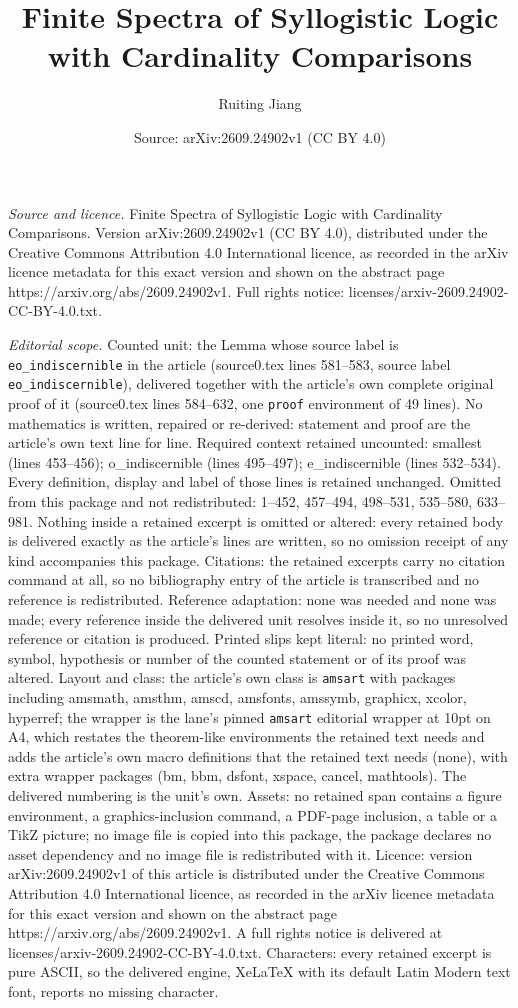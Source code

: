 \documentclass[10pt,a4paper]{amsart}
\title[Finite Spectra of Syllogistic Logic with Cardinality Compari]{Finite Spectra of Syllogistic Logic with Cardinality Comparisons}
\author{Ruiting Jiang}
\date{Source: arXiv:2609.24902v1 (CC BY 4.0)}
\begin{document}
\maketitle

\noindent\emph{Source and licence.} Finite Spectra of Syllogistic Logic with Cardinality Comparisons. Version arXiv:2609.24902v1 (CC BY 4.0), distributed under the Creative Commons Attribution 4.0 International licence, as recorded in the arXiv licence metadata for this exact version and shown on the abstract page https://arxiv.org/abs/2609.24902v1. Full rights notice: licenses/arxiv-2609.24902-CC-BY-4.0.txt.\par\smallskip

\noindent\textit{Editorial scope.} Counted unit: the Lemma whose source label is \texttt{eo\_indiscernible} in the article (source0.tex lines 581--583, source label \texttt{eo\_indiscernible}), delivered together with the article's own complete original proof of it (source0.tex lines 584--632, one \texttt{proof} environment of 49 lines). No mathematics is written, repaired or re-derived: statement and proof are the article's own text line for line. Required context retained uncounted: smallest (lines 453--456); o\_indiscernible (lines 495--497); e\_indiscernible (lines 532--534). Every definition, display and label of those lines is retained unchanged. Omitted from this package and not redistributed: 1--452, 457--494, 498--531, 535--580, 633--981. Nothing inside a retained excerpt is omitted or altered: every retained body is delivered exactly as the article's lines are written, so no omission receipt of any kind accompanies this package. Citations: the retained excerpts carry no citation command at all, so no bibliography entry of the article is transcribed and no reference is redistributed. Reference adaptation: none was needed and none was made; every reference inside the delivered unit resolves inside it, so no unresolved reference or citation is produced. Printed slips kept literal: no printed word, symbol, hypothesis or number of the counted statement or of its proof was altered. Layout and class: the article's own class is \texttt{amsart} with packages including amsmath, amsthm, amscd, amsfonts, amssymb, graphicx, xcolor, hyperref; the wrapper is the lane's pinned \texttt{amsart} editorial wrapper at 10pt on A4, which restates the theorem-like environments the retained text needs and adds the article's own macro definitions that the retained text needs (none), with extra wrapper packages (bm, bbm, dsfont, xspace, cancel, mathtools). The delivered numbering is the unit's own. Assets: no retained span contains a figure environment, a graphics-inclusion command, a PDF-page inclusion, a table or a TikZ picture; no image file is copied into this package, the package declares no asset dependency and no image file is redistributed with it. Licence: version arXiv:2609.24902v1 of this article is distributed under the Creative Commons Attribution 4.0 International licence, as recorded in the arXiv licence metadata for this exact version and shown on the abstract page https://arxiv.org/abs/2609.24902v1. A full rights notice is delivered at licenses/arxiv-2609.24902-CC-BY-4.0.txt. Characters: every retained excerpt is pure ASCII, so the delivered engine, XeLaTeX with its default Latin Modern text font, reports no missing character.
\end{document}
